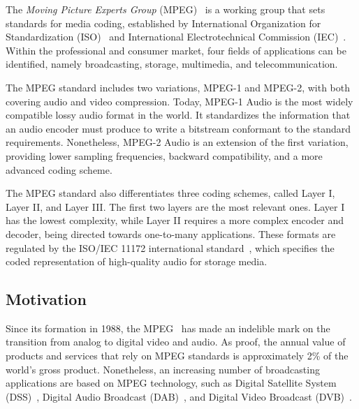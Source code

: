 The \textit{Moving Picture Experts Group} (MPEG)~\cite{MPEG} is a working group that sets standards for media coding, established by International Organization for Standardization (ISO)~\cite{iso} and International Electrotechnical Commission (IEC)~\cite{iec}. Within the professional and consumer market, four fields of applications can be identified, namely broadcasting, storage, multimedia, and telecommunication.

The MPEG standard includes two variations, MPEG-1 and MPEG-2, with both covering audio and video compression.  Today, MPEG-1 Audio is the most widely compatible lossy audio format in the world. It standardizes the information that an audio encoder must produce to write a bitstream conformant to the standard requirements.  Nonetheless, MPEG-2 Audio is an extension of the first variation, providing lower sampling frequencies, backward compatibility, and a more advanced coding scheme.

The MPEG standard also differentiates three coding schemes, called Layer I, Layer II, and Layer III.  The first two layers are the most relevant ones. Layer I has the lowest complexity, while Layer II requires a more complex encoder and decoder, being directed towards one-to-many applications. These formats are regulated by the ISO/IEC 11172 international standard~\cite{11172}, which specifies the coded representation of high-quality audio for storage media.

\subsection{Motivation}

Since its formation in 1988, the MPEG~\cite{MPEG} has made an indelible mark on the transition from analog to digital video and audio. As proof, the annual value of products and services that rely on MPEG standards is approximately 2\% of the world's gross product. Nonetheless, an increasing number of broadcasting applications are based on MPEG technology, such as Digital Satellite System (DSS)~\cite{dss}, Digital Audio Broadcast (DAB)~\cite{dab}, and Digital Video Broadcast (DVB)~\cite{dvb}. 

